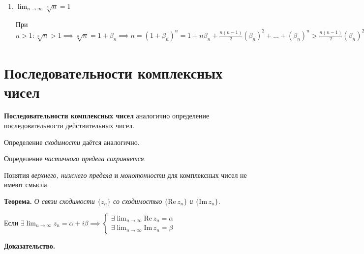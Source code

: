 \documentclass{article}
\newcommand{\parspace}{\vspace{10pt}}
\newcommand{\imagin}{\mathrm{Im} \,}
\newcommand{\real}{\mathrm{Re} \,}
\newcommand{\dslim}{\displaystyle\lim}
\newcommand{\dslimn}{\dslim_{n \to \infty}}
\begin{document}
\begin{enumerate}
    $\implies$ по \textit{$7^{\text{о}}$ свойству сходящихся последовательностей}
    $\dslimn \frac{a^n}{n!} = 0$

    
    \item $\dslimn \sqrt[n]{n} = 1$
    
    При $n > 1: \sqrt[n]{n} > 1 \implies \sqrt[n]{n} = 1 + \beta_n \implies
    n = (1 + \beta_n)^n = 1 + n \beta_n + \frac{n (n - 1)}{2} (\beta_n)^2 + \dots +
    (\beta_n)^n > \frac{n (n - 1)}{2} (\beta_n) ^ 2 \implies
    0 < \beta_n < \sqrt{\frac{2}{n-1}} \implies
    \dslimn \beta_n = 0 \implies
    \dslimn \sqrt[n]{n} = 1$
\end{enumerate}

\section{Последовательности комплексных чисел}

\textbf{Последовательности комплексных чисел} аналогично определение последовательности
действительных чисел.

Определение \textit{сходимости} даётся аналогично.

Определение \textit{частичного предела сохраняется}.

Понятия \textit{верхнего, нижнего предела} и \textit{монотонности} для комплексных
чисел не имеют смысла.

\parspace

\textbf{Теорема.} \textit{О связи сходимости $\{z_n\}$ со сходимостью $\{\real z_n\}$ и $\{\imagin z_n\}$.}

Если $\exists \dslimn z_n = \alpha + i \beta
\implies \begin{cases}
    \exists \dslimn \real z_n = \alpha \\
    \exists \dslimn \imagin z_n = \beta
\end{cases}$

\textbf{Доказательство.}
\end{document}
